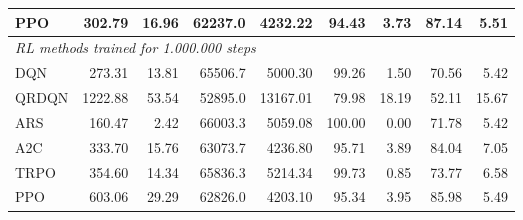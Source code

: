 \begin{samepage}
\begin{center}
\begin{tabular}{l|rr|rr|rr|rr}
    PPO          &   302.79 &    16.96 &    62237.0 &    4232.22 &   94.43 &    3.73 &   87.14 &    5.51 \\
    \midrule
    \multicolumn{9}{l}{\textit{RL methods trained for 1.000.000 steps}} \\
    \midrule
    DQN          &   273.31 &    13.81 &    65506.7 &    5000.30 &   99.26 &    1.50 &   70.56 &    5.42 \\
    QRDQN        &  1222.88 &    53.54 &    52895.0 &   13167.01 &   79.98 &   18.19 &   52.11 &   15.67 \\
    ARS          &   160.47 &     2.42 &    66003.3 &    5059.08 &  100.00 &    0.00 &   71.78 &    5.42 \\
    A2C          &   333.70 &    15.76 &    63073.7 &    4236.80 &   95.71 &    3.89 &   84.04 &    7.05 \\
    TRPO         &   354.60 &    14.34 &    65836.3 &    5214.34 &   99.73 &    0.85 &   73.77 &    6.58 \\
    PPO          &   603.06 &    29.29 &    62826.0 &    4203.10 &   95.34 &    3.95 &   85.98 &    5.49 \\
    \bottomrule
  \end{tabular}
\end{center}
\end{samepage}

